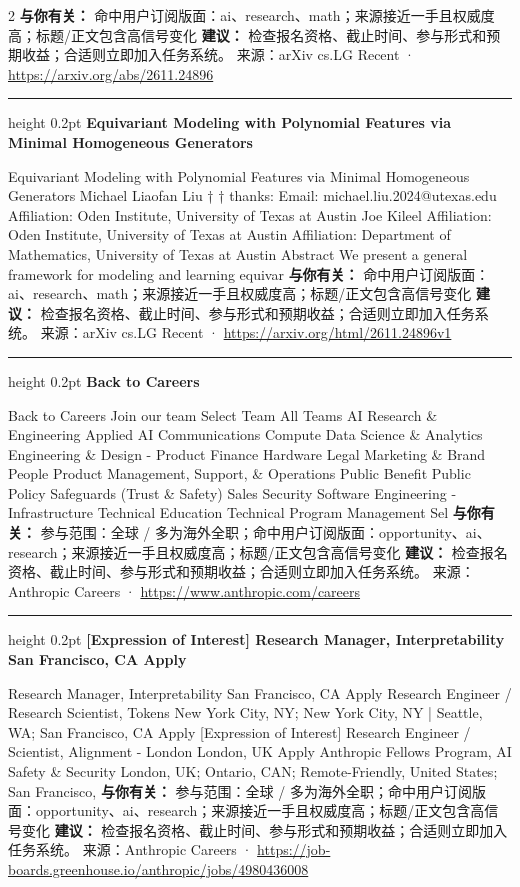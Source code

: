 \documentclass[10.5pt]{ctexart}
\begin{document}
\begin{multicols}{2}
\textbf{与你有关：} 命中用户订阅版面：ai、research、math；来源接近一手且权威度高；标题/正文包含高信号变化
\textbf{建议：} 检查报名资格、截止时间、参与形式和预期收益；合适则立即加入任务系统。
{\footnotesize\color{ormuted} 来源：arXiv cs.LG Recent · \url{https://arxiv.org/abs/2611.24896}}
\vspace{2mm}
\hrule height 0.2pt
\vspace{2mm}
{\large\bfseries Equivariant Modeling with Polynomial Features via Minimal Homogeneous Generators}\par
Equivariant Modeling with Polynomial Features via Minimal Homogeneous Generators Michael Liaofan Liu † † thanks: Email: michael.liu.2024@utexas.edu Affiliation: Oden Institute, University of Texas at Austin Joe Kileel Affiliation: Oden Institute, University of Texas at Austin Affiliation: Department of Mathematics, University of Texas at Austin Abstract We present a general framework for modeling and learning equivar
\textbf{与你有关：} 命中用户订阅版面：ai、research、math；来源接近一手且权威度高；标题/正文包含高信号变化
\textbf{建议：} 检查报名资格、截止时间、参与形式和预期收益；合适则立即加入任务系统。
{\footnotesize\color{ormuted} 来源：arXiv cs.LG Recent · \url{https://arxiv.org/html/2611.24896v1}}
\vspace{2mm}
\hrule height 0.2pt
\vspace{2mm}
{\large\bfseries Back to Careers}\par
Back to Careers Join our team Select Team All Teams AI Research \& Engineering Applied AI Communications Compute Data Science \& Analytics Engineering \& Design - Product Finance Hardware Legal Marketing \& Brand People Product Management, Support, \& Operations Public Benefit Public Policy Safeguards (Trust \& Safety) Sales Security Software Engineering - Infrastructure Technical Education Technical Program Management Sel
\textbf{与你有关：} 参与范围：全球 / 多为海外全职；命中用户订阅版面：opportunity、ai、research；来源接近一手且权威度高；标题/正文包含高信号变化
\textbf{建议：} 检查报名资格、截止时间、参与形式和预期收益；合适则立即加入任务系统。
{\footnotesize\color{ormuted} 来源：Anthropic Careers · \url{https://www.anthropic.com/careers}}
\vspace{2mm}
\hrule height 0.2pt
\vspace{2mm}
{\large\bfseries [Expression of Interest] Research Manager, Interpretability San Francisco, CA Apply}\par
[Expression of Interest] Research Manager, Interpretability San Francisco, CA Apply Research Engineer / Research Scientist, Tokens New York City, NY; New York City, NY | Seattle, WA; San Francisco, CA Apply [Expression of Interest] Research Engineer / Scientist, Alignment - London London, UK Apply Anthropic Fellows Program, AI Safety \& Security London, UK; Ontario, CAN; Remote-Friendly, United States; San Francisco, 
\textbf{与你有关：} 参与范围：全球 / 多为海外全职；命中用户订阅版面：opportunity、ai、research；来源接近一手且权威度高；标题/正文包含高信号变化
\textbf{建议：} 检查报名资格、截止时间、参与形式和预期收益；合适则立即加入任务系统。
{\footnotesize\color{ormuted} 来源：Anthropic Careers · \url{https://job-boards.greenhouse.io/anthropic/jobs/4980436008}}
\end{multicols}
\end{document}
